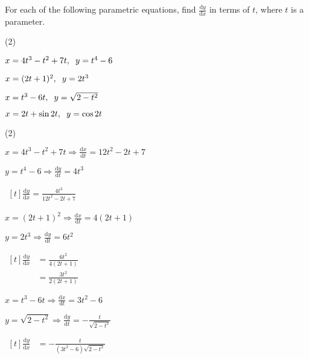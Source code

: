 \documentclass[11pt,a4paper]{book}
\begin{document}
\begin{example}

For each of the following parametric equations, find ${\displaystyle \frac{\mathrm{d}y}{\mathrm{d}x}}$
in terms of $t$, where $t$ is a parameter.

\begin{tasks}[label=(\alph*),label-width=3.5ex](2)

\task  $x=4t^{3}-t^{2}+7t,\hspace{0.2cm}y=t^{4}-6$

\task  $x=(2t+1)^{2},\hspace{0.2cm}y=2t^{3}$

\task  $x=t^{3}-6t,\hspace{0.2cm}y=\sqrt{2-t^{2}}$

\task  $x=2t+\sin2t,\hspace{0.2cm}y=\cos2t$

\end{tasks}

\Solution

\begin{tasks}[label=(\alph*),label-width=3.5ex](2)

\task  ${\displaystyle x=4t^{3}-t^{2}+7t\Rightarrow\frac{\mathrm{d}x}{\mathrm{d}t}=12t^{2}-2t+7}$

${\displaystyle y=t^{4}-6\Rightarrow\frac{\mathrm{d}y}{\mathrm{d}t}=4t^{3}}$

$
\begin{aligned}[t]
\frac{\mathrm{d}y}{\mathrm{d}x}=\frac{4t^{3}}{12t^{2}-2t+7}
\end{aligned}
$

\task ${\displaystyle x=(2t+1)^{2}\Rightarrow\frac{\mathrm{d}x}{\mathrm{d}t}=4\left(2t+1\right)}$

${\displaystyle y=2t^{3}\Rightarrow\frac{\mathrm{d}y}{\mathrm{d}t}=6t^{2}}$

$
\begin{aligned}[t]
\frac{\mathrm{d}y}{\mathrm{d}x} & =\frac{6t^{2}}{4\left(2t+1\right)}\\
 & =\frac{3t^{2}}{2\left(2t+1\right)}
\end{aligned}
$

\task ${\displaystyle x=t^{3}-6t\Rightarrow\frac{\mathrm{d}x}{\mathrm{d}t}=3t^{2}-6}$

${\displaystyle y=\sqrt{2-t^{2}}\Rightarrow\frac{\mathrm{d}y}{\mathrm{d}t}=-\frac{t}{\sqrt{2-t^{2}}}}$

$
\begin{aligned}[t]
\frac{\mathrm{d}y}{\mathrm{d}x} & =-\frac{t}{\left(3t^{2}-6\right)\sqrt{2-t^{2}}}
\end{aligned}
$


\end{tasks}
\end{example}
\end{document}
